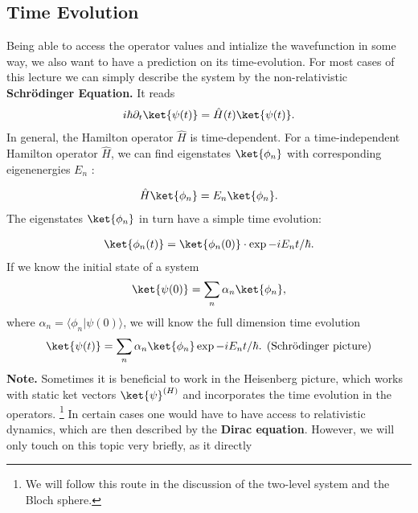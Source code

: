 \subsection{Time Evolution}
Being able to access the operator values and intialize the wavefunction in some way, we also want to have a prediction on its time-evolution. For most cases of this lecture we can simply describe the system by the non-relativistic \textbf{Schrödinger Equation.} It reads
\begin{align}
i\hbar\partial_t\ket{\psi(t)}=\hat{H}(t)\ket{\psi(t)}.
\end{align}
In general, the Hamilton operator $\hat{H}$ is time-dependent. For a time-independent Hamilton operator $\hat{H}$, we can find eigenstates $\ket{\phi_n}$ with corresponding eigenenergies $E_n$ :

\begin{align}
\hat{H}\ket{\phi_n}=E_n\ket{\phi_n}.
\end{align}
The eigenstates $\ket{\phi_n}$ in turn have a simple time evolution:

\begin{align}
    \ket{\phi_n(t)}=\ket{\phi_n(0)}\cdot \exp{-i E_nt/\hbar}.
\end{align}
If we know the initial state of a system
\begin{align}
\ket{\psi(0)}=\sum_n \alpha_n\ket{\phi_n},
\end{align}
where $\alpha_n=\langle\phi_n | \psi(0)\rangle$, we will know the full dimension time evolution
\begin{align}
\ket{\psi(t)}=\sum_n\alpha_n\ket{\phi_n}\exp{-i E_n t/\hbar}. \;\, \text{(Schrödinger picture)}
\end{align}
\textbf{Note.} Sometimes it is beneficial to work in the Heisenberg picture, which works with static ket vectors $\ket{\psi}^{(H)}$ and incorporates the time evolution in the operators. \footnote{We will follow this route in the discussion of the two-level system and the Bloch sphere.}
In certain cases one would have to have access to relativistic dynamics, which are then described by the \textbf{Dirac equation}. However, we will only touch on this topic very briefly, as it directly 
